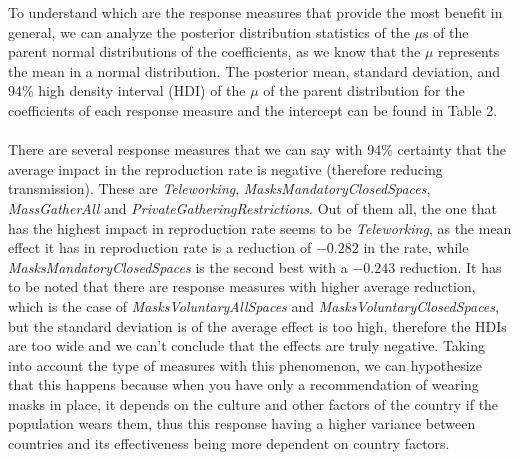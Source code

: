 \documentclass{article}
\begin{document}
To understand which are the response measures that provide the most benefit in general, we can analyze the posterior distribution statistics of the $\mu$s of the parent normal distributions of the coefficients, as we know that the $\mu$ represents the mean in a normal distribution. The posterior mean, standard deviation, and 94\% high density interval (HDI) of the $\mu$ of the parent distribution for the coefficients of each response measure and the intercept can be found in Table 2.\\
\\
There are several response measures that we can say with 94\% certainty that the average impact in the reproduction rate is negative (therefore reducing transmission). These are \textit{Teleworking}, \textit{MasksMandatoryClosedSpaces}, \textit{MassGatherAll} and \textit{PrivateGatheringRestrictions}. Out of them all, the one that has the highest impact in reproduction rate seems to be \textit{Teleworking}, as the mean effect it has in reproduction rate is a reduction of $-0.282$ in the rate, while \textit{MasksMandatoryClosedSpaces} is the second best with a  $-0.243$ reduction. It has to be noted that there are response measures with higher average reduction, which is the case of \textit{MasksVoluntaryAllSpaces} and \textit{MasksVoluntaryClosedSpaces}, but the standard deviation is of the average effect is too high, therefore the HDIs are too wide and we can't conclude that the effects are truly negative. Taking into account the type of measures with this phenomenon, we can hypothesize that this happens because when you have only a recommendation of wearing masks in place, it depends on the culture and other factors of the country if the population wears them, thus this response having a higher variance between countries and its effectiveness being more dependent on country factors.
\end{document}
